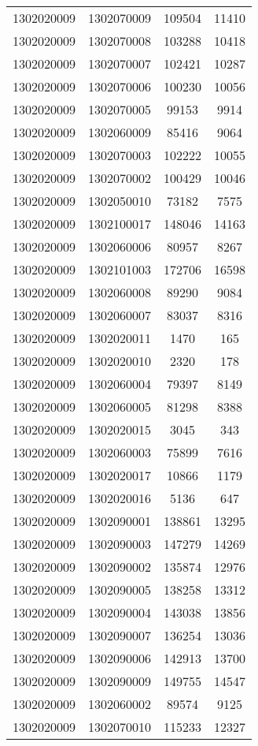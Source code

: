 \begin{longtable}[h]{llcc}
		1302020009 & 1302070009 & 109504 & 11410\\
		1302020009 & 1302070008 & 103288 & 10418\\
		1302020009 & 1302070007 & 102421 & 10287\\
		1302020009 & 1302070006 & 100230 & 10056\\
		1302020009 & 1302070005 & 99153 & 9914\\
		1302020009 & 1302060009 & 85416 & 9064\\
		1302020009 & 1302070003 & 102222 & 10055\\
		1302020009 & 1302070002 & 100429 & 10046\\
		1302020009 & 1302050010 & 73182 & 7575\\
		1302020009 & 1302100017 & 148046 & 14163\\
		1302020009 & 1302060006 & 80957 & 8267\\
		1302020009 & 1302101003 & 172706 & 16598\\
		1302020009 & 1302060008 & 89290 & 9084\\
		1302020009 & 1302060007 & 83037 & 8316\\
		1302020009 & 1302020011 & 1470 & 165\\
		1302020009 & 1302020010 & 2320 & 178\\
		1302020009 & 1302060004 & 79397 & 8149\\
		1302020009 & 1302060005 & 81298 & 8388\\
		1302020009 & 1302020015 & 3045 & 343\\
		1302020009 & 1302060003 & 75899 & 7616\\
		1302020009 & 1302020017 & 10866 & 1179\\
		1302020009 & 1302020016 & 5136 & 647\\
		1302020009 & 1302090001 & 138861 & 13295\\
		1302020009 & 1302090003 & 147279 & 14269\\
		1302020009 & 1302090002 & 135874 & 12976\\
		1302020009 & 1302090005 & 138258 & 13312\\
		1302020009 & 1302090004 & 143038 & 13856\\
		1302020009 & 1302090007 & 136254 & 13036\\
		1302020009 & 1302090006 & 142913 & 13700\\
		1302020009 & 1302090009 & 149755 & 14547\\
		1302020009 & 1302060002 & 89574 & 9125\\
		1302020009 & 1302070010 & 115233 & 12327\\

\end{longtable}

